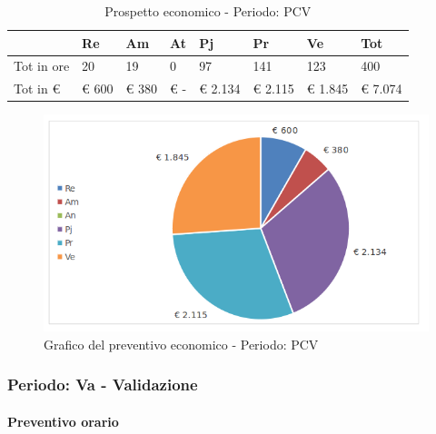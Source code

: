 							\begin{table}[H] \begin{center} \begin{tabular}{llllllll}
							\toprule
								&	\textbf{Re}	&	\textbf{Am}	&	\textbf{At}	&	\textbf{Pj}	&	\textbf{Pr}	&	\textbf{Ve}	&	\textbf{Tot}\\

							\midrule
							Tot in ore	&	20	&	19	&	0	&	97	&	141	&	123	&	400	 \\ 
							Tot in €	&	 € 600 	 & 	 € 380 	 & 	 € -   	 & 	 € 2.134 	 & 	 € 2.115 	 & 	 € 1.845 	 & 	 € 7.074 	 \\ 
							\bottomrule
							\end{tabular} \end{center} \caption{Prospetto economico - Periodo:
							PCV
							}\label{tab:s_PCV} \end{table}		\begin{figure}[H]  \centering  \includegraphics[scale=0.40]{img/s_PCV.png}
									\caption{Grafico del preventivo economico - Periodo: 								PCV	}  \label{fig:s_PCV} \end{figure}

		\newpage
		\subsubsection {Periodo: Va - Validazione}
		\paragraph{Preventivo orario}

